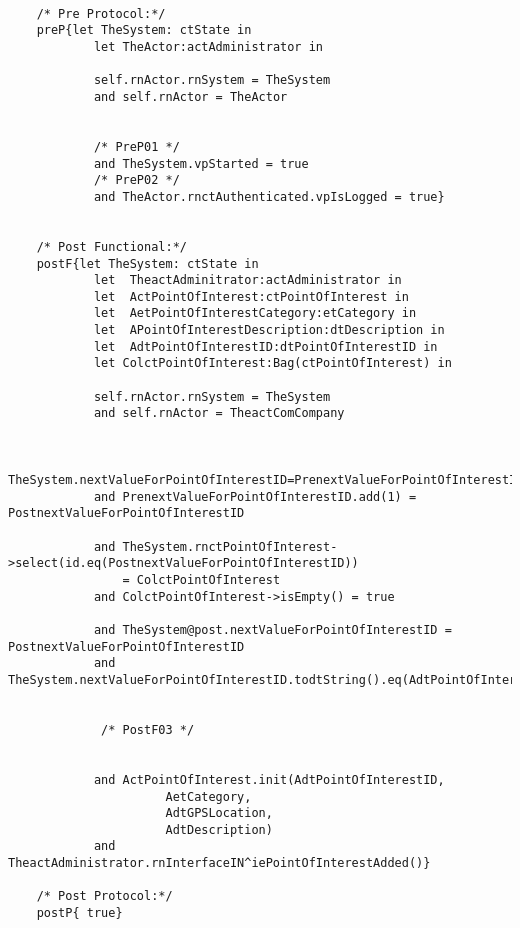 	\scriptsize
	\vspace{0.5cm}
	\begin{lstlisting}[style=MessirStyle,firstnumber=auto,captionpos=b,caption={\msrmessir (MCL-oriented) specification of the operation \emph{oeAddPointOfInterest}.},label=OM-actAdministrator-oeAddPointOfInterest-MCL-LST]

	/* Pre Protocol:*/ 
	preP{let TheSystem: ctState in
	  		let TheActor:actAdministrator in
	  
	 		self.rnActor.rnSystem = TheSystem
	  		and self.rnActor = TheActor
	  		
	  
			/* PreP01 */
	  		and TheSystem.vpStarted = true
			/* PreP02 */
	  		and TheActor.rnctAuthenticated.vpIsLogged = true}
	
	
	/* Post Functional:*/ 
	postF{let TheSystem: ctState in
			let  TheactAdminitrator:actAdministrator in
	 		let  ActPointOfInterest:ctPointOfInterest in
	 		let  AetPointOfInterestCategory:etCategory in
	 		let  APointOfInterestDescription:dtDescription in
	 		let  AdtPointOfInterestID:dtPointOfInterestID in
	 		let ColctPointOfInterest:Bag(ctPointOfInterest) in
	 
	  		self.rnActor.rnSystem = TheSystem
	  		and self.rnActor = TheactComCompany
			
			
	 		TheSystem.nextValueForPointOfInterestID=PrenextValueForPointOfInterestID
	 		and PrenextValueForPointOfInterestID.add(1) = PostnextValueForPointOfInterestID
	 		
			and TheSystem.rnctPointOfInterest->select(id.eq(PostnextValueForPointOfInterestID))
	      		= ColctPointOfInterest
	  		and ColctPointOfInterest->isEmpty() = true
	  		
	 		and TheSystem@post.nextValueForPointOfInterestID = PostnextValueForPointOfInterestID
			and TheSystem.nextValueForPointOfInterestID.todtString().eq(AdtPointOfInterestID)
			
	
	 		 /* PostF03 */
	
	
			and ActPointOfInterest.init(AdtPointOfInterestID,
	                  AetCategory,
	                  AdtGPSLocation,
	                  AdtDescription)
	      	and TheactAdministrator.rnInterfaceIN^iePointOfInterestAdded()}
	
	/* Post Protocol:*/ 
	postP{ true}
	
	\end{lstlisting}
	\normalsize 
	
	
	
	





